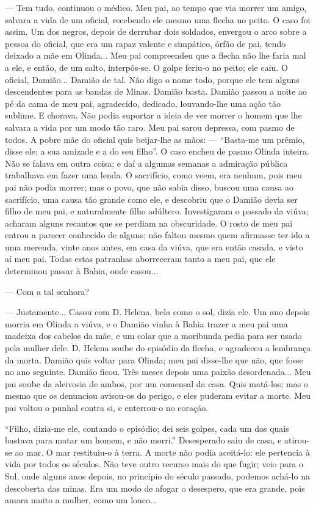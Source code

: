 --- Tem tudo, continuou o médico. Meu pai, ao tempo que via morrer um
amigo, salvara a vida de um oficial, recebendo ele mesmo uma flecha no
peito. O caso foi assim. Um dos negros, depois de derrubar dois
soldados, envergou o arco sobre a pessoa do oficial, que era um rapaz
valente e simpático, órfão de pai, tendo deixado a mãe em Olinda... Meu
pai compreendeu que a flecha não lhe faria mal a ele, e então, de um
salto, interpôs-se. O golpe feriu-o no peito; ele caiu. O oficial,
Damião... Damião de tal. Não digo o nome todo, porque ele tem alguns
descendentes para as bandas de Minas. Damião basta. Damião passou a
noite ao pé da cama de meu pai, agradecido, dedicado, louvando-lhe uma
ação tão sublime. E chorava. Não podia suportar a ideia de ver morrer o
homem que lhe salvara a vida por um modo tão raro. Meu pai sarou
depressa, com pasmo de todos. A pobre mãe do oficial quis beijar-lhe as
mãos: --- ``Basta-me um prêmio, disse ele; a sua amizade e a do seu
filho''. O caso encheu de pasmo Olinda inteira. Não se falava em outra
coisa; e daí a algumas semanas a admiração pública trabalhava em fazer
uma lenda. O sacrifício, como veem, era nenhum, pois meu pai não podia
morrer; mas o povo, que não sabia disso, buscou uma causa ao sacrifício,
uma causa tão grande como ele, e descobriu que o Damião devia ser filho
de meu pai, e naturalmente filho adúltero. Investigaram o passado da
viúva; acharam alguns recantos que se perdiam na obscuridade. O rosto de
meu pai entrou a parecer conhecido de alguns; não faltou mesmo quem
afirmasse ter ido a uma merenda, vinte anos antes, em casa da viúva, que
era então casada, e visto aí meu pai. Todas estas patranhas aborreceram
tanto a meu pai, que ele determinou passar à Bahia, onde casou...

--- Com a tal senhora?

--- Justamente... Casou com D. Helena, bela como o sol, dizia ele. Um
ano depois morria em Olinda a viúva, e o Damião vinha à Bahia trazer a
meu pai uma madeixa dos cabelos da mãe, e um colar que a moribunda pedia
para ser usado pela mulher dele. D. Helena soube do episódio da flecha,
e agradeceu a lembrança da morta. Damião quis voltar para Olinda; meu
pai disse-lhe que não, que fosse no ano seguinte. Damião ficou. Três
meses depois uma paixão desordenada... Meu pai soube da aleivosia de
ambos, por um comensal da casa. Quis matá-los; mas o mesmo que os
denunciou avisou-os do perigo, e eles puderam evitar a morte. Meu pai
voltou o punhal contra si, e enterrou-o no coração.

``Filho, dizia-me ele, contando o episódio; dei seis golpes, cada um dos
quais bastava para matar um homem, e não morri.'' Desesperado saiu de
casa, e atirou-se ao mar. O mar restituiu-o à terra. A morte não podia
aceitá-lo: ele pertencia à vida por todos os séculos. Não teve outro
recurso mais do que fugir; veio para o Sul, onde alguns anos depois, no
princípio do século passado, podemos achá-lo na descoberta das minas.
Era um modo de afogar o desespero, que era grande, pois amara muito a
mulher, como um louco...

